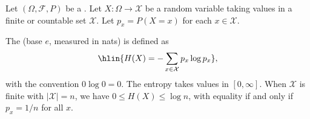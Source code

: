 \begin{definition} \label{definition:shannon_entropy_of_a_discrete_random_variable}
Let $(\Omega, \mathcal{F}, P)$ be a . Let $X: \Omega \to \mathcal{X}$ be a random variable taking values in a finite or countable set $\mathcal{X}$. Let $p_x = P(X = x)$ for each $x \in \mathcal{X}$.

The  (base $e$, measured in nats) is defined as
$$\hlin{H(X) = -\sum_{x \in \mathcal{X}} p_x \log p_x},$$
with the convention $0 \log 0 = 0$. The entropy takes values in $[0, \infty]$. When $\mathcal{X}$ is finite with $|\mathcal{X}| = n$, we have $0 \leq H(X) \leq \log n$, with equality if and only if $p_x = 1/n$ for all $x$.
\end{definition}